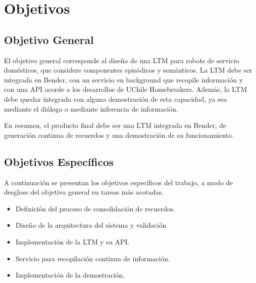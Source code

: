 


\section{Objetivos}

\subsection{Objetivo General}

El objetivo general corresponde al diseño de una LTM para robots de servicio domésticos, que considere componentes episódicos y semánticos. La LTM debe ser integrada en Bender, con un servicio en background que recopile información y con una API acorde a los desarrollos de UChile Homebreakers. Además, la LTM debe quedar integrada con alguna demostración de esta capacidad, ya sea mediante el diálogo o mediante inferencia de información.

En resumen, el producto final debe ser una LTM integrada en Bender, de generación continua de recuerdos y una demostración de su funcionamiento.


\subsection{Objetivos Específicos}

A continuación se presentan los objetivos específicos del trabajo, a modo de desglose del objetivo general en tareas más acotadas.

\begin{itemize}
\item Definición del proceso de consolidación de recuerdos.
\item Diseño de la arquitectura del sistema y validación
\item Implementación de la LTM y su API.
\item Servicio para recopilación continua de información.
\item Implementación de la demostración.
\end{itemize}

